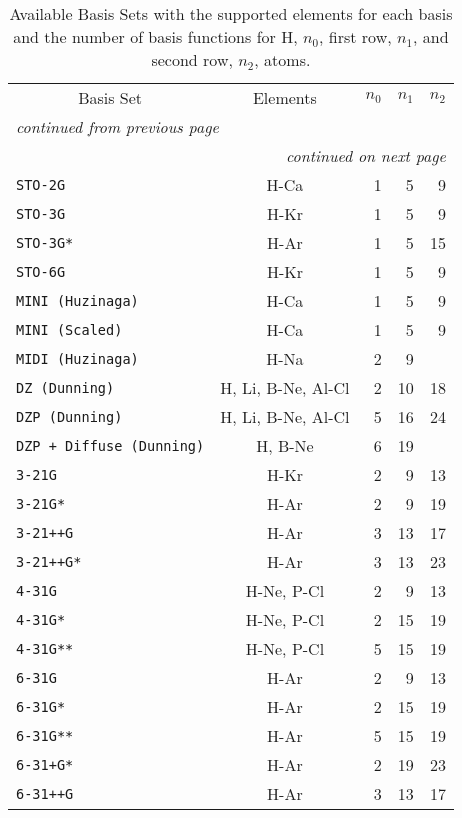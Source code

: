 \begin{latexonly}
\begin{longtable}{lcrrr}
\label{basissets}
\caption{Available Basis Sets with the supported elements for each basis
and the number of basis functions for H, $n_0$, first row, $n_1$, and
second row, $n_2$, atoms.} \\
\hline\hline
  \multicolumn{1}{c}{Basis Set}&
   \multicolumn{1}{c}{Elements}&
   \multicolumn{1}{c}{$n_0$}&
   \multicolumn{1}{c}{$n_1$}&
   \multicolumn{1}{c}{$n_2$} \\
\hline
\endfirsthead
\multicolumn{5}{l}{\small\sl continued from previous page} \\ \hline
\endhead
\hline \multicolumn{5}{r}{\small\sl continued on next page} \\
\endfoot
\hline\hline
\endlastfoot
\verb*|STO-2G| & H-Ca & 1 & 5 & 9 \\
\verb*|STO-3G| & H-Kr & 1 & 5 & 9 \\
\verb*|STO-3G*| & H-Ar & 1 & 5 & 15 \\
\verb*|STO-6G| & H-Kr & 1 & 5 & 9 \\
\verb*|MINI (Huzinaga)| & H-Ca & 1 & 5 & 9 \\
\verb*|MINI (Scaled)| & H-Ca & 1 & 5 & 9 \\
\verb*|MIDI (Huzinaga)| & H-Na & 2 & 9 &  \\
\verb*|DZ (Dunning)| & H, Li, B-Ne, Al-Cl & 2 & 10 & 18 \\
\verb*|DZP (Dunning)| & H, Li, B-Ne, Al-Cl & 5 & 16 & 24 \\
\verb*|DZP + Diffuse (Dunning)| & H, B-Ne & 6 & 19 &  \\
\verb*|3-21G| & H-Kr & 2 & 9 & 13 \\
\verb*|3-21G*| & H-Ar & 2 & 9 & 19 \\
\verb*|3-21++G| & H-Ar & 3 & 13 & 17 \\
\verb*|3-21++G*| & H-Ar & 3 & 13 & 23 \\
\verb*|4-31G| & H-Ne, P-Cl & 2 & 9 & 13 \\
\verb*|4-31G*| & H-Ne, P-Cl & 2 & 15 & 19 \\
\verb*|4-31G**| & H-Ne, P-Cl & 5 & 15 & 19 \\
\verb*|6-31G| & H-Ar & 2 & 9 & 13 \\
\verb*|6-31G*| & H-Ar & 2 & 15 & 19 \\
\verb*|6-31G**| & H-Ar & 5 & 15 & 19 \\
\verb*|6-31+G*| & H-Ar & 2 & 19 & 23 \\
\verb*|6-31++G| & H-Ar & 3 & 13 & 17 \\

\end{longtable}
\end{latexonly}
